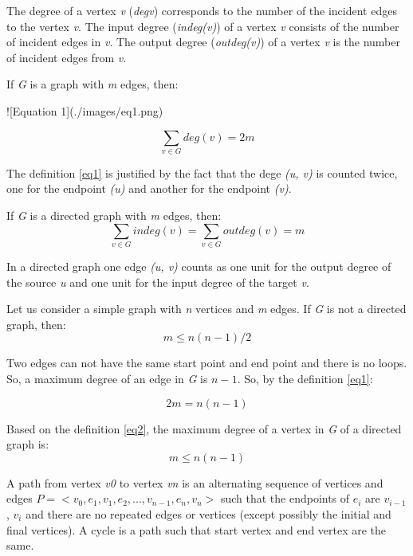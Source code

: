 \documentclass[a4paper]{article}
\begin{document}
    The degree of a vertex \emph{v} (\emph{deg{v}}) corresponds to
    the number of the incident edges to the vertex \emph{v}.
    The input degree (\emph{indeg(v)}) of a vertex \emph{v} consists
    of the number of incident edges in \emph{v}.
    The output degree (\emph{outdeg(v)}) of a vertex \emph{v} is the
    number of incident edges from \emph{v}.

    If \emph{G} is a graph with \emph{m} edges, then:

    ![Equation 1](./images/eq1.png)

    \begin{equation} \label{eq1}
        \sum_{v \in G} deg(v) = 2m
    \end{equation}

    The definition \ref{eq1} is justified by the fact that the dege
    \emph{(u, v)} is counted twice, one for the endpoint \emph{(u)} and
    another for the endpoint \emph{(v)}.

    If \emph{G} is a directed graph with \emph{m} edges, then:
    \begin{equation} \label{eq2}
        \sum_{v \in G} indeg(v) = \sum_{v \in G} outdeg(v) = m
    \end{equation}

    In a directed graph one edge \emph{(u, v)} counts as one unit
    for the output degree of the source \emph{u} and one unit for
    the input degree of the target \emph{v}.

    Let us consider a simple graph with \emph{n} vertices and \emph{m}
    edges. If \emph{G} is not a directed graph, then:
    \begin{equation} \label{eq3}
        m \le n(n - 1) / 2
    \end{equation}

    Two edges can not have the same start point and end point and there
    is no loops. So, a maximum degree of an edge in \emph{G} is $n - 1$.
    So, by the definition \ref{eq1}:

    \begin{equation} \label{eq4}
        2m = n(n - 1)
    \end{equation}

    Based on the definition \ref{eq2}, the maximum degree of a vertex in \emph{G}
    of a directed graph is:
    \begin{equation}
        m \le n(n-1)
    \end{equation}



    A path from vertex \emph{v0} to vertex \emph{vn} is an alternating sequence of
    vertices and edges $ P =< v_0, e_1, v_1, e_2, ..., v_{n-1}, e_n, v_n > $
    such that the endpoints of $ e_i $ are $ v_{i-1} $, $ v_i $ and there are no
    repeated edges or vertices (except possibly the initial and final vertices).
    A cycle is a path such that start vertex and end vertex are the same.
\end{document}
